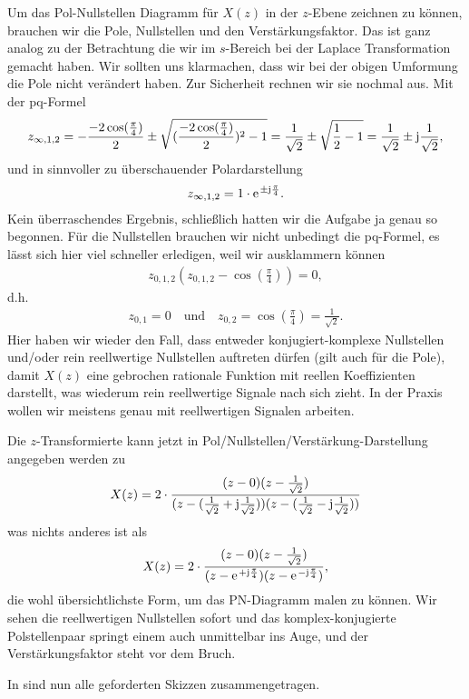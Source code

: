 \begin{ExCalc}
Um das Pol-Nullstellen Diagramm für $X(z)$ in der $z$-Ebene zeichnen zu können,
brauchen wir  die Pole, Nullstellen und den Verstärkungsfaktor.
Das ist ganz analog zu der Betrachtung die wir im $s$-Bereich bei der Laplace
Transformation gemacht haben.
%
Wir sollten uns klarmachen, dass wir bei der obigen Umformung die Pole nicht
verändert haben. Zur Sicherheit rechnen wir sie nochmal aus. Mit der pq-Formel
\begin{align}
z_{\infty,1,2} = -\frac{-2\cos(\frac{\pi}{4})}{2} \pm \sqrt{(\frac{-2 \cos(\frac{\pi}{4})}{2})^2-1}
=
\frac{1}{\sqrt{2}} \pm \sqrt{\frac{1}{2}-1}
=
\frac{1}{\sqrt{2}} \pm \im \frac{1}{\sqrt{2}},
\end{align}
und in sinnvoller zu überschauender Polardarstellung
\begin{align}
z_{\infty,1,2} = 1 \cdot \e^{\pm \im \frac{\pi}{4}}.
\end{align}
Kein überraschendes Ergebnis, schließlich hatten wir die Aufgabe ja genau so begonnen.
%
Für die Nullstellen brauchen wir nicht unbedingt die pq-Formel,
es lässt sich hier viel schneller erledigen, weil wir ausklammern können
\begin{align}
z_{0,1,2} (z_{0,1,2} - \cos(\frac{\pi}{4})) = 0,
\end{align}
d.h.
\begin{align}
z_{0,1} = 0\quad \text{und} \quad z_{0,2} = \cos(\frac{\pi}{4})=\frac{1}{\sqrt{2}}.
\end{align}
Hier haben wir wieder den Fall, dass entweder konjugiert-komplexe Nullstellen
und/oder rein reellwertige Nullstellen auftreten dürfen (gilt auch für die Pole),
damit $X(z)$ eine gebrochen rationale Funktion mit reellen Koeffizienten
darstellt, was wiederum rein reellwertige Signale nach sich zieht. In der Praxis
wollen wir meistens genau mit reellwertigen Signalen arbeiten.
%

Die $z$-Transformierte kann jetzt in Pol/Nullstellen/Verstärkung-Darstellung
angegeben werden zu
\begin{align}
X(z) = 2 \cdot \frac{(z-0) (z-\frac{1}{\sqrt{2}})}{(z-(\frac{1}{\sqrt{2}} + \im \frac{1}{\sqrt{2}})) (z-(\frac{1}{\sqrt{2}} - \im \frac{1}{\sqrt{2}}))}
\end{align}
was nichts anderes ist als
\begin{align}
X(z) = 2 \cdot \frac{(z-0) (z-\frac{1}{\sqrt{2}})}{(z-\e^{+ \im \frac{\pi}{4}})(z-\e^{-\im \frac{\pi}{4}})},
\end{align}
die wohl übersichtlichste Form, um das PN-Diagramm malen zu können. Wir sehen
die reellwertigen Nullstellen sofort und das komplex-konjugierte Polstellenpaar
springt einem auch unmittelbar ins Auge, und der Verstärkungsfaktor steht
vor dem Bruch.
%
\end{ExCalc}
\begin{Loesung}
In  sind nun alle geforderten Skizzen zusammengetragen.
\end{Loesung}



